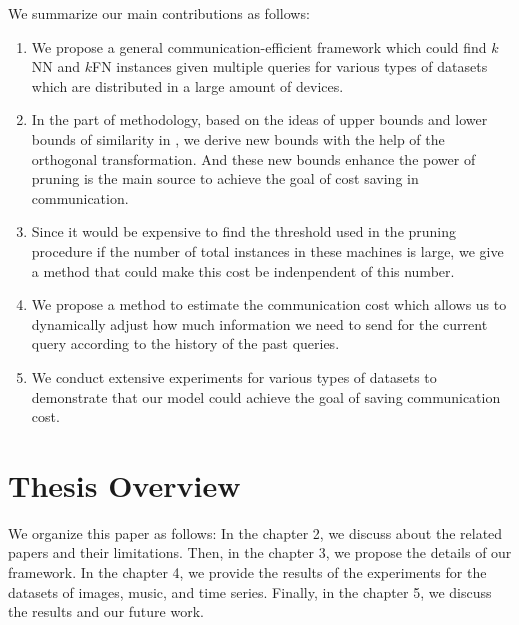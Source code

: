 We summarize our main contributions as follows:
\begin{enumerate}
	\item We propose a general communication-efficient framework which could find $k$NN and $k$FN instances  given multiple queries for various types of datasets which are distributed in a large amount of devices.
	\item In the part of methodology, based on the ideas of upper bounds and lower bounds of similarity in \cite{LeeWave}, we derive new bounds with the help of the orthogonal transformation.  And these new bounds  enhance the power of pruning is the main source to achieve the goal of cost saving in communication. 
	\item Since it would be expensive to find the threshold used in the pruning procedure if the number of total instances in these machines is large, we give a method that could make this cost be indenpendent of this number.
	\item We propose a method to estimate the communication cost which allows us to dynamically adjust how much information we need to send for the current query according to the history of the past queries.
	\item We conduct extensive experiments for various types of datasets to demonstrate that our model could achieve the goal of saving communication cost.
\end{enumerate}

\section{Thesis Overview}
\label{s:ThesisOverview}
We organize this paper as follows: In the chapter 2, we discuss about the related papers and their limitations.  Then, in the chapter 3, we propose the details of our framework. In the chapter 4, we provide the results of the experiments for the datasets of images, music, and time series.  Finally, in the chapter 5, we discuss the results and our future work.

%
%
